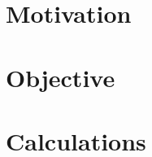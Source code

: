 \section{Motivation}\label{sec:motivation}


\section{Objective}\label{sec:objective}


\section{Calculations}\label{sec:calculations}
